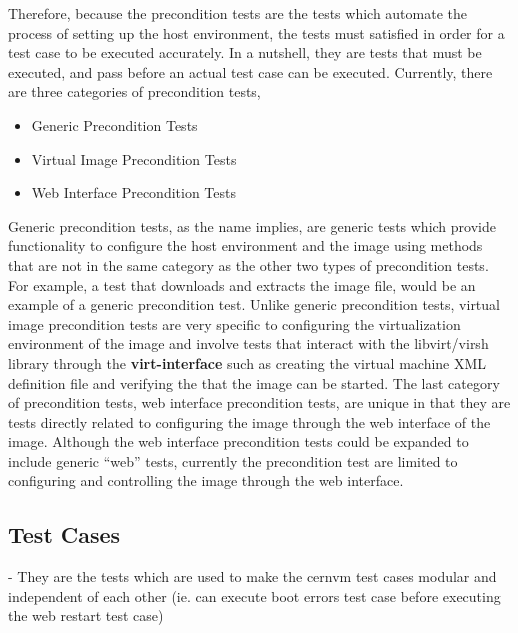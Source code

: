 Therefore, because the precondition tests are the tests which automate the process of setting up the host environment, the tests must
satisfied in order for a \cernvm test case to be executed accurately. In a nutshell, they are tests that must be executed, and pass before an 
actual test case can be executed. Currently, there are three categories of precondition tests, 

\begin{itemize}
\item	Generic Precondition Tests
\item	Virtual Image Precondition Tests
\item	Web Interface Precondition Tests
\end{itemize}

Generic precondition tests, as the name implies, are generic tests which provide functionality to configure the host environment and the
\cernvm image using methods that are not in the same category as the other two types of precondition tests. For example, a test that 
downloads and extracts the \cernvm image file, would be an example of a generic precondition test. Unlike generic precondition tests, 
virtual image precondition tests are very specific to configuring the virtualization environment of the \cernvm image and involve tests 
that interact with the libvirt/virsh library through the {\bf virt-interface} such as creating the virtual machine XML definition file 
and verifying the that the \cernvm image can be started. The last category of precondition tests, web interface precondition tests, 
are unique in that they are tests directly related to configuring the \cernvm image through the web interface of the \cernvm image. 
Although the web interface precondition tests could be expanded to include generic ``web'' tests, currently the precondition test are 
limited to configuring and controlling the \cernvm image through the web interface.




\subsection{\cernvm Test Cases}
\label{sct:cernvmtestcases}



- They are the tests which are used to make the cernvm test cases modular and
  independent of each other (ie. can execute boot errors test case before executing
  the web restart test case)
 